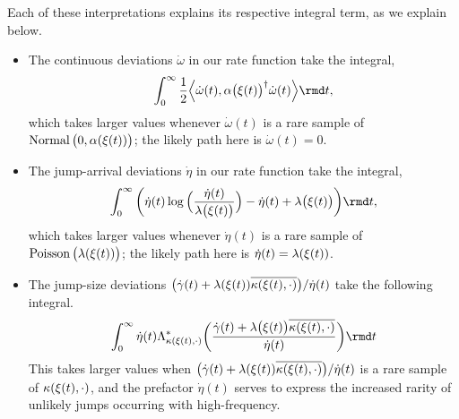 Each of these interpretations explains its respective integral term, as we explain below.
\begin{itemize}
  \item
    The continuous deviations $\dot\omega$ in our rate function take the integral,
    \begin{equation*}
      \int_0^\infty \frac12 \Bprj{\dot\omega(t)}{\affDiff\big(\pathVar(t)\big)^\dagger \dot\omega(t)} \rmd t,
    \end{equation*}
    which takes larger values whenever $\dot\omega(t)$ is a rare sample of $\operatorname{Normal}\big(0, \alpha(\xi(t))\big)$; the likely path here is $\dot\omega(t) = 0$.
  \item
    The jump-arrival deviations $\dot\eta$ in our rate function take the integral,
    \begin{equation*}
      \int_0^\infty \bigg( \dot\eta(t)\log\Big(\frac{\dot\eta(t)}{\affInt\big(\pathVar(t)\big)} \Big) - \dot\eta(t) + \affInt\big(\pathVar(t)\big) \bigg) \rmd t,
    \end{equation*}
    which takes larger values whenever $\dot\eta(t)$ is a rare sample of $\operatorname{Poisson}\big(\lambda(\xi(t))\big)$; the likely path here is $\dot\eta(t) = \lambda(\xi(t))$.
  \item
    The jump-size deviations $\big(\dot\gamma(t)+\lambda(\xi(t))\overline{\kappa(\xi(t), \cdot)}\big)/\dot\eta(t)$ take the following integral.
    \begin{equation*}
      \int_0^\infty \dot\eta(t) \ode_{\affDist(\pathVar(t),\cdot)}^*\bigg( \frac{\dot\gamma(t) + \affInt\big(\pathVar(t)\big)\overline{\affDist(\pathVar(t), \cdot)}}{\dot\eta(t)} \bigg) \rmd t
    \end{equation*}
    This takes larger values when $\big(\dot\gamma(t)+\lambda(\xi(t))\overline{\kappa(\xi(t), \cdot)}\big)/\dot\eta(t)$ is a rare sample of $\kappa(\xi(t), \cdot)$, and the prefactor $\dot\eta(t)$ serves to express the increased rarity of unlikely jumps occurring with high-frequency.
\end{itemize}

